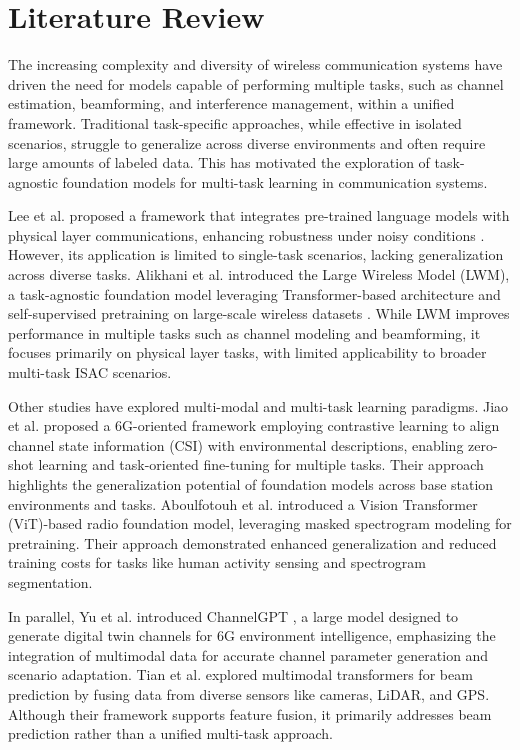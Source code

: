 \section{Literature Review}
The increasing complexity and diversity of wireless communication systems have driven the need for models capable of performing multiple tasks, such as channel estimation, beamforming, and interference management, within a unified framework. Traditional task-specific approaches, while effective in isolated scenarios, struggle to generalize across diverse environments and often require large amounts of labeled data. This has motivated the exploration of task-agnostic foundation models for multi-task learning in communication systems.


Lee et al. proposed a framework that integrates pre-trained language models with physical layer communications, enhancing robustness under noisy conditions \cite{Ju-HyungLee}. However, its application is limited to single-task scenarios, lacking generalization across diverse tasks. Alikhani et al. introduced the Large Wireless Model (LWM), a task-agnostic foundation model leveraging Transformer-based architecture and self-supervised pretraining on large-scale wireless datasets \cite{LWM}. While LWM improves performance in multiple tasks such as channel modeling and beamforming, it focuses primarily on physical layer tasks, with limited applicability to broader multi-task ISAC scenarios. 

Other studies have explored multi-modal and multi-task learning paradigms. Jiao et al. \cite{jiao20246G} proposed a 6G-oriented framework employing contrastive learning to align channel state information (CSI) with environmental descriptions, enabling zero-shot learning and task-oriented fine-tuning for multiple tasks. Their approach highlights the generalization potential of foundation models across base station environments and tasks. Aboulfotouh et al. \cite{aboulfotouh2024building} introduced a Vision Transformer (ViT)-based radio foundation model, leveraging masked spectrogram modeling for pretraining. Their approach demonstrated enhanced generalization and reduced training costs for tasks like human activity sensing and spectrogram segmentation.

In parallel, Yu et al. introduced ChannelGPT \cite{ChannelGPT}, a large model designed to generate digital twin channels for 6G environment intelligence, emphasizing the integration of multimodal data for accurate channel parameter generation and scenario adaptation. Tian et al. \cite{tian2023multimodal} explored multimodal transformers for beam prediction by fusing data from diverse sensors like cameras, LiDAR, and GPS. Although their framework supports feature fusion, it primarily addresses beam prediction rather than a unified multi-task approach.

